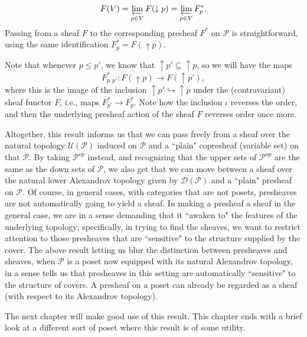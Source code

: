 \documentclass[a4paper]{book}
\theoremstyle{definition}
\theoremstyle{definition}
\theoremstyle{definition}
\theoremstyle{theorem}
\theoremstyle{definition}
\begin{document}
\begin{equation*}
F(V) = \varprojlim_{p \in V} F(\downarrow p) = \varprojlim_{p \in V} F^*_p. 
\end{equation*}
Passing from a sheaf $F$ to the corresponding presheaf $F^*$ on $\mathcal{P}$ is straightforward, using the same identification $F^*_p = F(\uparrow p)$. \par 
Note that whenever $p \leq p'$, we know that $\uparrow p' \subseteq  \uparrow p$, so we will have the maps 
\begin{equation*}
F^*_{p, p'}: F(\uparrow p) \rightarrow F(\uparrow p'), 
\end{equation*} where this is the image of the inclusion $\uparrow p' \hookrightarrow \uparrow p$ under the (contravariant) sheaf functor $F$, i.e., maps $F^*_{p'} \rightarrow F^*_{p}$. Note how the inclusion $\iota$ reverses the order, and then the underlying presheaf action of the sheaf $F$ reverses order once more. \par 
Altogether, this result informs us that we can pass freely from a sheaf over the natural topology $\mathcal{U}(\mathcal{P})$ induced on $\mathcal{P}$ and a ``plain" copresheaf (variable set) on that $\mathcal{P}$. By taking $\mathcal{P}^{op}$ instead, and recognizing that the upper sets of $\mathcal{P}^{op}$ are the same as the down sets of $\mathcal{P}$, we also get that we can move between a sheaf over the natural lower Alexandrov topology given by $\mathcal{D}(\mathcal{P})$ and a ``plain" presheaf on $\mathcal{P}$. 
Of course, in general cases, with categories that are not posets, presheaves are not automatically going to yield a sheaf. In making a presheaf a sheaf in the general case, we are in a sense demanding that it ``awaken to" the features of the underlying topology; specifically, in trying to find the sheaves, we want to restrict attention to those presheaves that are ``sensitive" to the structure supplied by the cover. The above result letting us blur the distinction between presheaves and sheaves, when $\mathcal{P}$ is a poset now equipped with its natural Alexandrov topology, in a sense tells us that presheaves in this setting are automatically ``sensitive" to the structure of covers. A presheaf on a poset can already be regarded as a sheaf (with respect to its Alexandrov topology).\par 
The next chapter will make good use of this result. This chapter ends with a brief look at a different sort of poset where this result is of some utility.  
\end{document}
